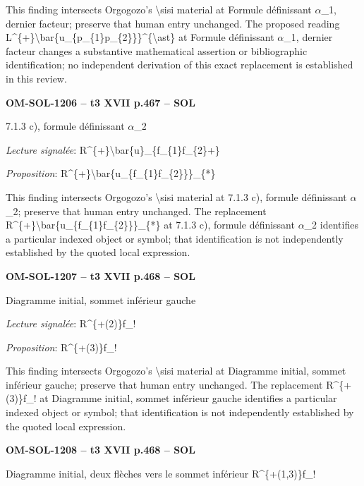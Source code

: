 This finding intersects Orgogozo's \textbackslash{}sisi material at Formule définissant \ensuremath{\alpha}\_1, dernier facteur; preserve that human entry unchanged. The proposed reading L\textasciicircum{}\{+\}\textbackslash{}bar\{u\_\{p\_\{1\}p\_\{2\}\}\}\textasciicircum{}\{\textbackslash{}ast\} at Formule définissant \ensuremath{\alpha}\_1, dernier facteur changes a substantive mathematical assertion or bibliographic identification; no independent derivation of this exact replacement is established in this review.\par
\par\noindent\textbf{OM-SOL-1206 -- t3 XVII p.467 -- SOL}\par
7.1.3 c), formule définissant \ensuremath{\alpha}\_2\par
\emph{Lecture signalée}: R\textasciicircum{}\{+\}\textbackslash{}bar\{u\}\_\{f\_\{1\}f\_\{2\}+\}\par
\emph{Proposition}: R\textasciicircum{}\{+\}\textbackslash{}bar\{u\_\{f\_\{1\}f\_\{2\}\}\}\_\{*\}\par
This finding intersects Orgogozo's \textbackslash{}sisi material at 7.1.3 c), formule définissant \ensuremath{\alpha}\_2; preserve that human entry unchanged. The replacement R\textasciicircum{}\{+\}\textbackslash{}bar\{u\_\{f\_\{1\}f\_\{2\}\}\}\_\{*\} at 7.1.3 c), formule définissant \ensuremath{\alpha}\_2 identifies a particular indexed object or symbol; that identification is not independently established by the quoted local expression.\par
\par\noindent\textbf{OM-SOL-1207 -- t3 XVII p.468 -- SOL}\par
Diagramme initial, sommet inférieur gauche\par
\emph{Lecture signalée}: R\textasciicircum{}\{+(2)\}f\_!\par
\emph{Proposition}: R\textasciicircum{}\{+(3)\}f\_!\par
This finding intersects Orgogozo's \textbackslash{}sisi material at Diagramme initial, sommet inférieur gauche; preserve that human entry unchanged. The replacement R\textasciicircum{}\{+(3)\}f\_! at Diagramme initial, sommet inférieur gauche identifies a particular indexed object or symbol; that identification is not independently established by the quoted local expression.\par
\par\noindent\textbf{OM-SOL-1208 -- t3 XVII p.468 -- SOL}\par
Diagramme initial, deux flèches vers le sommet inférieur R\textasciicircum{}\{+(1,3)\}f\_!\par
